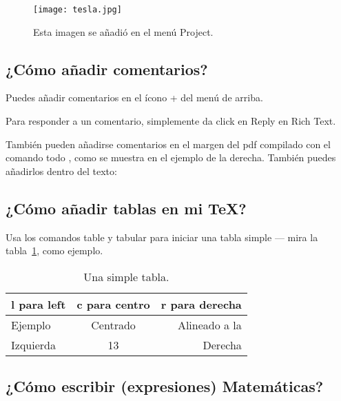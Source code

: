 \documentclass[a4paper]{article}
\begin{document}
\begin{figure}
\centering
\texttt{[image: tesla.jpg]}
\caption{\label{fig:tesla}Esta imagen se añadió en el menú Project.}
\end{figure}


\subsection{¿Cómo añadir comentarios?}
% 
% 
% 

Puedes añadir comentarios en el ícono + del menú de arriba.

Para responder a un comentario, simplemente da click en Reply en Rich Text.

También pueden añadirse comentarios en el margen del pdf compilado con el comando todo , como se muestra en el ejemplo de la derecha. También puedes añadirlos dentro del texto:


\subsection{¿Cómo añadir tablas en mi \TeX?}

Usa los comandos table y tabular para iniciar una tabla simple --- mira la tabla~\ref{tab:tabla ejemplo}, como ejemplo. 

\begin{table}
\centering
\begin{tabular}{l c r} 
l para left & c para centro & r para derecha \\ \hline
Ejemplo & Centrado & Alineado a la\\
Izquierda & 13 & Derecha
\end{tabular}
\caption{\label{tab:tabla ejemplo}Una simple tabla.}
\end{table}

\subsection{¿Cómo escribir (expresiones) Matemáticas?}
\end{document}
